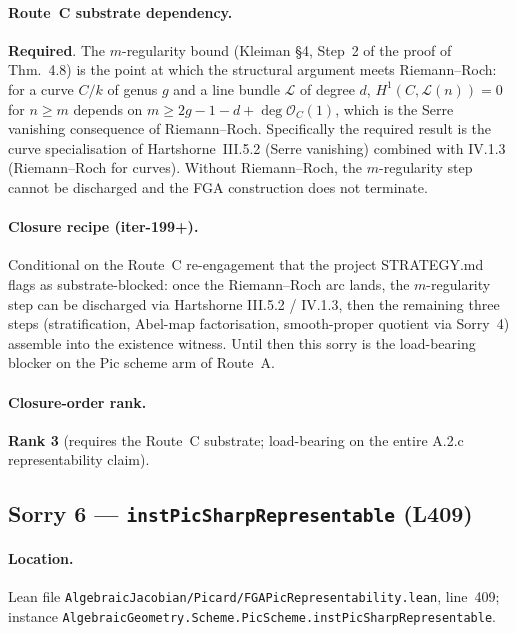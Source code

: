 \paragraph{Route~C substrate dependency.} \textbf{Required}. The
$m$-regularity bound (Kleiman \S4, Step~2 of the proof of
Thm.~4.8) is the point at which the structural argument
meets Riemann--Roch: for a curve $C/k$ of genus $g$ and a line
bundle $\mathcal{L}$ of degree $d$, $H^1(C, \mathcal{L}(n)) = 0$ for
$n \geq m$ depends on $m \geq 2g - 1 - d + \deg \mathcal{O}_C(1)$, which
is the Serre vanishing consequence of Riemann--Roch. Specifically the
required result is the curve specialisation of
Hartshorne~III.5.2 (Serre vanishing) combined with IV.1.3
(Riemann--Roch for curves). Without Riemann--Roch, the $m$-regularity
step cannot be discharged and the FGA construction does not
terminate.

\paragraph{Closure recipe (iter-199+).} Conditional on the Route~C
re-engagement that the project STRATEGY.md flags as
substrate-blocked: once the Riemann--Roch arc lands, the $m$-regularity
step can be discharged via Hartshorne III.5.2 / IV.1.3, then the
remaining three steps (stratification, Abel-map factorisation,
smooth-proper quotient via Sorry~4) assemble into the existence
witness. Until then this sorry is the load-bearing blocker on the
Pic scheme arm of Route~A.

\paragraph{Closure-order rank.} \textbf{Rank 3} (requires the Route~C
substrate; load-bearing on the entire A.2.c representability claim).

\subsection{Sorry 6 --- \texttt{instPicSharpRepresentable} (L409)}
\label{subsec:sorry_pic_sharp_representable}

\paragraph{Location.} Lean file
\texttt{AlgebraicJacobian/Picard/FGAPicRepresentability.lean},
line~409; instance
\texttt{AlgebraicGeometry.Scheme.PicScheme.instPicSharpRepresentable}.

